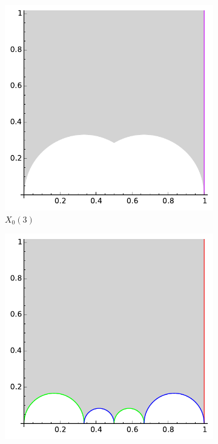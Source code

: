\documentclass[11pt]{article}
\theoremstyle{plain}
\theoremstyle{remark}
\begin{document}
\begin{figure}
\begin{subfigure}{.5\linewidth}
	\includegraphics[width=1\linewidth]{X0_3.pdf}
	\caption{$X_0(3)$\label{X0_3.svg}}
	\end{subfigure}
	\newline
	\begin{subfigure}{.5\linewidth}
	\centering
	\includegraphics[width=1\linewidth]{X0_11.pdf}

\end{subfigure}
\end{figure}
\end{document}
